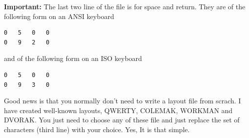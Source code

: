 \documentclass{amsart}
\begin{document}
{\bfseries Important:} The last two line of the file is for space and return. They are of the following
form on an ANSI keyboard

\begin{verbatim}
0   5   0   0
0   9   2   0
\end{verbatim}
and of the following form on an ISO keyboard

\begin{verbatim}
0   5   0   0
0   9   3   0
\end{verbatim}

Good news is that you normally don't need to write a layout file from scrach. I have created well-known layouts,
QWERTY, COLEMAK, WORKMAN and DVORAK. You just need to choose any of these file and just replace the 
set of characters (third line) with your choice. Yes, It is that simple.
\end{document}
